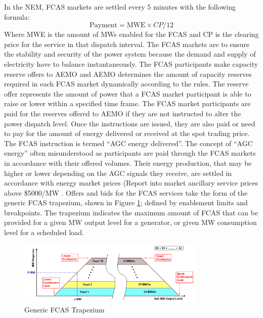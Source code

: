 In the NEM, FCAS markets are settled every 5 minutes with the following formula:
\begin{equation}
    \text{Payment} = \text{MWE} \times CP/12 
\end{equation}
Where MWE is the amount of MWs enabled for the FCAS and CP is the clearing price for the service in that dispatch interval. The FCAS markets are to ensure the stability and security of the power system because the demand and supply of electricity have to balance instantaneously. The FCAS participants make capacity reserve offers to AEMO and AEMO determines the amount of capacity reserves required in each FCAS market dynamically according to the rules. The reserve offer represents the amount of power that a FCAS market participant is able to raise or lower within a specified time frame. The FCAS market participants are paid for the reserves offered to AEMO if they are not instructed to alter the power dispatch level. Once the instructions are issued, they are also paid or need to pay for the amount of energy delivered or received at the spot trading price. The FCAS instruction is termed “AGC energy delivered”. The concept of “AGC energy” often misunderstood as participants are paid through the FCAS markets in accordance with their offered volumes. Their energy production, that may be higher or lower depending on the AGC signals they receive, are settled in accordance with energy market prices (Report into market ancillary service prices above \$5000/MW \parencite{AEMO_FCAS_REPORT}.
\newline
\newline
Offers and bids for the FCAS services take the form of the generic FCAS trapezium, shown in Figure \ref{fig:fcas_trapzium}; defined by enablement limits and breakpoints. The trapezium indicates the maximum amount of FCAS that can be provided for a given MW output level for a generator, or given MW consumption level for a scheduled load. 
\begin{figure}[H]
    \centering
    \includegraphics[width=0.8\textwidth]{Pictures/Chapter2/fcas_trap.PNG}
    \caption{ Generic FCAS Trapezium \parencite{AEMO_NEM}}
    \label{fig:fcas_trapzium}
\end{figure}
